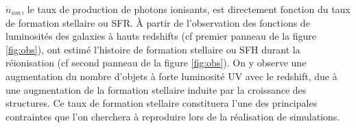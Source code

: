$\dot{n}_{ion}$, le taux de production de photons ionisants, est directement fonction du taux de formation stellaire ou \ac{SFR}.
À partir de l'observation des fonctions de luminosités des galaxies à hauts redshifts (cf premier panneau de la figure \ref{fig:obs}), \cite{bouwens_reionization_2015} ont estimé l'histoire de formation stellaire ou \ac{SFH} durant la réionisation (cf second panneau de la figure \ref{fig:obs}).
On y observe une augmentation du nombre d'objets à forte luminosité UV avec le redshift, due à une augmentation de la formation stellaire induite par la croissance des structures.
Ce taux de formation stellaire constituera l'une des principales contraintes que l'on cherchera à reproduire lors de la réalisation de simulations.









